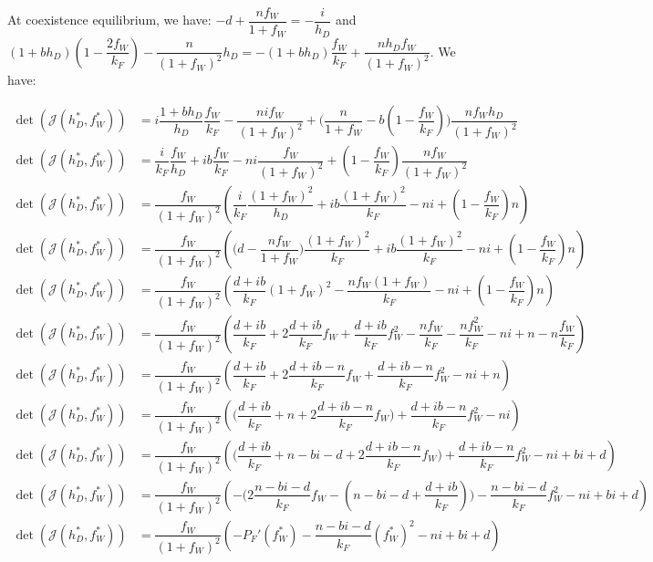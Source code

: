 \documentclass{article}
\begin{document}
At coexistence equilibrium, we have: $-d + \dfrac{nf_W}{1 + f_W} = -\dfrac{i}{h_D}$ and $(1+bh_D)(1 - \dfrac{2f_W}{k_F}) - \dfrac{n}{(1 + f_W)^2}h_D = -(1+b h_D) \dfrac{f_W}{k_F} + \dfrac{n h_D f_W}{(1+f_W)^2}$.
We have:

\begin{align*}
\det(\mathcal{J}(h_D^*, f_W^*)) &= i \dfrac{1 + bh_D}{h_D} \dfrac{f_W}{k_F} - \dfrac{n i f_W}{(1+f_W)^2} + \Big(\dfrac{n}{1+f_W} - b (1 - \dfrac{f_W}{k_F}) \Big) \dfrac{n f_W h_D}{(1+f_W)^2} \\
\det(\mathcal{J}(h_D^*, f_W^*)) &= \dfrac{i}{k_F}\dfrac{f_W}{h_D} + ib \dfrac{f_W}{k_F} - ni \dfrac{f_W}{(1+f_W)^2} +(1-\dfrac{f_W}{k_F})\dfrac{n f_W}{(1+f_W)^2} \\
\det(\mathcal{J}(h_D^*, f_W^*)) &= \dfrac{f_W}{(1 + f_W)^2} \left(\dfrac{i}{k_F}\dfrac{(1+f_W)^2}{h_D} + ib \dfrac{(1+f_W)^2}{k_F} - ni +(1-\dfrac{f_W}{k_F})n \right) \\
\det(\mathcal{J}(h_D^*, f_W^*)) &= \dfrac{f_W}{(1 + f_W)^2} \left(\Big(d - \dfrac{nf_W}{1 + f_W} \Big)\dfrac{(1+f_W)^2}{k_F} + ib \dfrac{(1+f_W)^2}{k_F} - ni +(1-\dfrac{f_W}{k_F})n \right)\\
\det(\mathcal{J}(h_D^*, f_W^*)) &= \dfrac{f_W}{(1 + f_W)^2} \left(\dfrac{d + ib}{k_F}(1+f_W)^2  - \dfrac{nf_W(1+f_W)}{k_F} - ni +(1-\dfrac{f_W}{k_F})n \right)\\
\det(\mathcal{J}(h_D^*, f_W^*)) &= \dfrac{f_W}{(1 + f_W)^2} \left(\dfrac{d + ib}{k_F} + 2\dfrac{d + ib}{k_F}f_W + \dfrac{d + ib}{k_F}f_W^2  - \dfrac{nf_W}{k_F} -\dfrac{nf_W^2}{k_F} - ni + n- n\dfrac{f_W}{k_F} \right)\\
\det(\mathcal{J}(h_D^*, f_W^*)) &= \dfrac{f_W}{(1 + f_W)^2} \left(\dfrac{d + ib}{k_F} + 2\dfrac{d + ib - n}{k_F}f_W + \dfrac{d + ib -n}{k_F}f_W^2  - ni + n \right)\\
\det(\mathcal{J}(h_D^*, f_W^*)) &= \dfrac{f_W}{(1 + f_W)^2} \left( \Big(\dfrac{d + ib}{k_F} + n + 2\dfrac{d + ib - n}{k_F}f_W\Big) + \dfrac{d + ib -n}{k_F}f_W^2  - ni \right)\\
\det(\mathcal{J}(h_D^*, f_W^*)) &= \dfrac{f_W}{(1 + f_W)^2} \left( \Big(\dfrac{d + ib}{k_F} + n -bi - d + 2\dfrac{d + ib - n}{k_F}f_W\Big) + \dfrac{d + ib -n}{k_F}f_W^2  - ni +bi + d \right)\\
\det(\mathcal{J}(h_D^*, f_W^*)) &= \dfrac{f_W}{(1 + f_W)^2} \left( - \Big(2\dfrac{n - bi -d}{k_F}f_W - (n - bi -d + \dfrac{d + ib}{k_F}) \Big) - \dfrac{n - bi - d}{k_F}f_W^2  - ni +bi + d \right) \\
\det(\mathcal{J}(h_D^*, f_W^*)) &= \dfrac{f_W}{(1 + f_W)^2} \left( - P_F'(f_W^*) - \dfrac{n - bi - d}{k_F}(f_W^*)^2  - ni +bi + d \right)
\end{align*}
\end{document}
